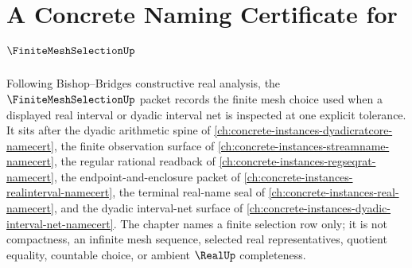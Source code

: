 \chapter{A Concrete Naming Certificate for $\FiniteMeshSelectionUp$}
\label{ch:concrete-instances-finite-mesh-selection-namecert}

Following Bishop--Bridges constructive real analysis, the $\FiniteMeshSelectionUp$ packet records the finite mesh choice used when a displayed real interval or dyadic interval net is inspected at one explicit tolerance. It sits after the dyadic arithmetic spine of \autoref{ch:concrete-instances-dyadicratcore-namecert}, the finite observation surface of \autoref{ch:concrete-instances-streamname-namecert}, the regular rational readback of \autoref{ch:concrete-instances-regseqrat-namecert}, the endpoint-and-enclosure packet of \autoref{ch:concrete-instances-realinterval-namecert}, the terminal real-name seal of \autoref{ch:concrete-instances-real-namecert}, and the dyadic interval-net surface of \autoref{ch:concrete-instances-dyadic-interval-net-namecert}. The chapter names a finite selection row only; it is not compactness, an infinite mesh sequence, selected real representatives, quotient equality, countable choice, or ambient $\RealUp$ completeness.

